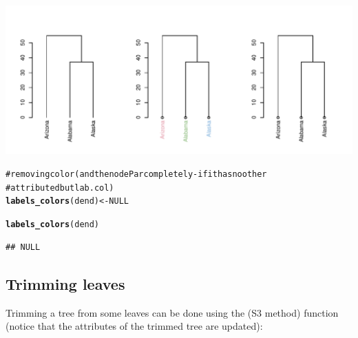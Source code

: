\documentclass[shortnames,nojss,article]{jss}\usepackage{graphicx, color}
\makeatletter
\def\maxwidth{ %
  \ifdim\Gin@nat@width>\linewidth
    \linewidth
  \else
    \Gin@nat@width
  \fi
}
\newcommand{\hlfunctioncall}[1]{\textcolor[rgb]{0.501960784313725,0,0.329411764705882}{\textbf{#1}}}%
\newcommand{\hlcomment}[1]{\textcolor[rgb]{0.180392156862745,0.6,0.341176470588235}{#1}}%
\newenvironment{kframe}{%
 \def\at@end@of@kframe{}%
 \ifinner\ifhmode%
  \def\at@end@of@kframe{\end{minipage}}%
  \begin{minipage}{\columnwidth}%
 \fi\fi%
 \def\FrameCommand##1{\hskip\@totalleftmargin \hskip-\fboxsep
 \colorbox{shadecolor}{##1}\hskip-\fboxsep
     \hskip-\linewidth \hskip-\@totalleftmargin \hskip\columnwidth}%
 \MakeFramed {\advance\hsize-\width
   \@totalleftmargin\z@ \linewidth\hsize
   \@setminipage}}%
 {\par\unskip\endMakeFramed%
 \at@end@of@kframe}
\newenvironment{knitrout}{}{} %
\makeatother
\begin{document}
\begin{knitrout}
{\centering \includegraphics[width=\maxwidth]{figure/unnamed-chunk-23} 

}


\begin{kframe}\begin{alltt}

\hlcomment{# removing color (and the nodePar completely - if it has no other}
\hlcomment{# attributed but lab.col)}
\hlfunctioncall{labels_colors}(dend) <- NULL
\end{alltt}


{\ttfamily\noindent\color{warningcolor}{\#\# Warning: Length of color vector was shorter then the number of leaves - vector color recycled}}

{\ttfamily\noindent\color{warningcolor}{\#\# Warning: 'x' is NULL so the result will be NULL}}\begin{alltt}
\hlfunctioncall{labels_colors}(dend)
\end{alltt}
\begin{verbatim}
## NULL
\end{verbatim}
\end{kframe}
\end{knitrout}




\subsection{Trimming leaves}

Trimming a tree from some leaves can be done using the  (S3 method) function (notice that the attributes of the trimmed tree are updated):
\end{document}

